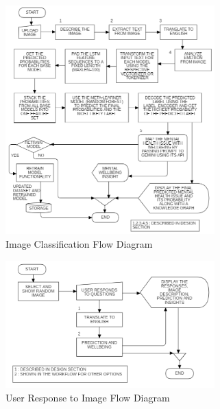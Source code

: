 \pagebreak

\begin{figure}[h!]  
    \centering
    \includegraphics[width=0.72\textwidth]{Images/APP IMAGE OPTION.png}  
    \caption*{Image Classification Flow Diagram}
    \label{011232i}  %
\end{figure}

\begin{figure}[h!]  
    \centering
    \includegraphics[width=0.72\textwidth]{Images/APP RESPOND.png}  
    \caption*{User Response to Image Flow Diagram}
    \label{01234i}  %
\end{figure}

\pagebreak

